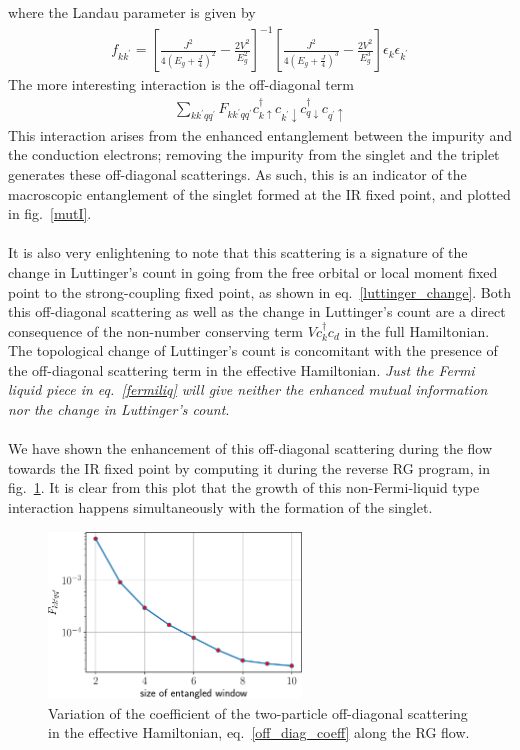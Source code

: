 \documentclass[twoside]{report}
\numberwithin{equation}{section}
\begin{document}
where the Landau parameter is given by
\begin{equation}\begin{aligned}
	\label{fermiliq}
	f_{kk^\prime} = \left[\frac{J^2}{4\left( E_g + \frac{J}{4} \right)^2} - \frac{2V^2}{E_g^2}\right]^{-1}\left[\frac{J^2}{4\left( E_g + \frac{J}{4} \right) ^3} - \frac{2V^2}{E_g^3}\right]\epsilon_k \epsilon_{k^\prime}
\end{aligned}\end{equation}
The more interesting interaction is the off-diagonal term
\begin{equation}\begin{aligned}
	 \sum_{kk^\prime q q^\prime} F_{kk^\prime qq^\prime}c^\dagger_{k \uparrow}c_{k^\prime \downarrow}c^\dagger_{q \downarrow}c_{q^\prime \uparrow}
\end{aligned}\end{equation}
This interaction arises from the enhanced entanglement between the impurity and the conduction electrons; removing the impurity from the singlet and the triplet generates these off-diagonal scatterings. As such, this is an indicator of the macroscopic entanglement of the singlet formed at the IR fixed point, and plotted in fig.~\ref{mutI}. 
\\\\It is also very enlightening to note that this scattering is a signature of the change in Luttinger's count in going from the free orbital or local moment fixed point to the strong-coupling fixed point, as shown in eq.~\ref{luttinger_change}. Both this off-diagonal scattering as well as the change in Luttinger's count are a direct consequence of the non-number conserving term \(V c^\dagger_{k} c_d\) in the full Hamiltonian. The topological change of Luttinger's count is concomitant with the presence of the off-diagonal scattering term in the effective Hamiltonian. \textit{Just the Fermi liquid piece in eq.~\ref{fermiliq} will give neither the enhanced mutual information nor the change in Luttinger's count}.
\\\\We have shown the enhancement of this off-diagonal scattering during the flow towards the IR fixed point by computing it during the reverse RG program, in fig.~\ref{Fkkqq}. It is clear from this plot that the growth of this non-Fermi-liquid type interaction happens simultaneously with the formation of the singlet.
\begin{figure}[htpb]
	\centering
	\includegraphics[width=0.6\textwidth]{../figures/Fkkqq.pdf}
	\caption{Variation of the coefficient of the two-particle off-diagonal scattering in the effective Hamiltonian, eq.~\ref{off_diag_coeff} along the RG flow.}
	\label{Fkkqq}
\end{figure}
\end{document}
